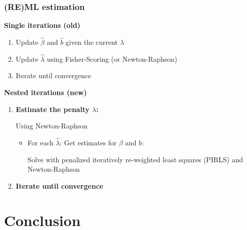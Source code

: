 \documentclass[final]{beamer}
\begin{document}





\begin{frame}
\frametitle{(RE)ML estimation}

\textcolor{beamer@postercolour}{\textbf{Single iterations (old)}}
\begin{enumerate}
\item Update  $\hat{\beta}$ and $\hat{b}$ given the current $\lambda$
\item Update $\hat{\lambda}$ using Fisher-Scoring (or Newton-Raphson)
\item Iterate until convergence
\end{enumerate}

\vspace{0.5em}
\pause

\textcolor{beamer@postercolour}{\textbf{Nested iterations (new)}}
\begin{enumerate}
\item \textbf{Estimate the penalty $\lambda$:}

Using Newton-Raphson
\begin{itemize}
\item For each $\hat{\lambda}$: Get estimates for $\beta$ and $b$: 

Solve with penalized iteratively re-weighted least squares (PIRLS) and Newton-Raphson
\end{itemize}
\item \textbf{Iterate until convergence}
\end{enumerate}
\end{frame}





\section{Conclusion}
\end{document}
